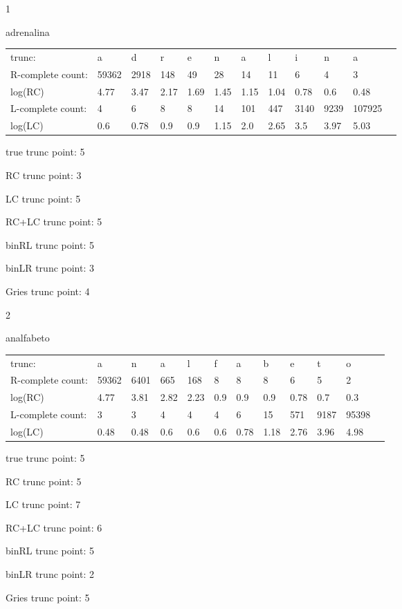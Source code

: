 \documentclass[10pt]{article}
\begin{document}
1

adrenalina

\begin{tabular}{l|lllllllllll}
trunc: & a & d & r & e & n & a & l & i & n & a & \\ 
R-complete count: & 59362 & 2918 & 148 & 49 & 28 & 14 & 11 & 6 & 4 & 3 & \\ 
log(RC) & 4.77 & 3.47 & 2.17 & 1.69 & 1.45 & 1.15 & 1.04 & 0.78 & 0.6 & 0.48 & \\ 
L-complete count: & 4 & 6 & 8 & 8 & 14 & 101 & 447 & 3140 & 9239 & 107925 & \\ 
log(LC) & 0.6 & 0.78 & 0.9 & 0.9 & 1.15 & 2.0 & 2.65 & 3.5 & 3.97 & 5.03 & \\ 
\end{tabular}

true trunc point: 5

RC trunc point: 3

LC trunc point: 5

RC+LC trunc point: 5

binRL trunc point: 5

binLR trunc point: 3

Gries trunc point: 4

\vspace{1em}

2

analfabeto

\begin{tabular}{l|lllllllllll}
trunc: & a & n & a & l & f & a & b & e & t & o & \\ 
R-complete count: & 59362 & 6401 & 665 & 168 & 8 & 8 & 8 & 6 & 5 & 2 & \\ 
log(RC) & 4.77 & 3.81 & 2.82 & 2.23 & 0.9 & 0.9 & 0.9 & 0.78 & 0.7 & 0.3 & \\ 
L-complete count: & 3 & 3 & 4 & 4 & 4 & 6 & 15 & 571 & 9187 & 95398 & \\ 
log(LC) & 0.48 & 0.48 & 0.6 & 0.6 & 0.6 & 0.78 & 1.18 & 2.76 & 3.96 & 4.98 & \\ 
\end{tabular}

true trunc point: 5

RC trunc point: 5

LC trunc point: 7

RC+LC trunc point: 6

binRL trunc point: 5

binLR trunc point: 2

Gries trunc point: 5
\end{document}

